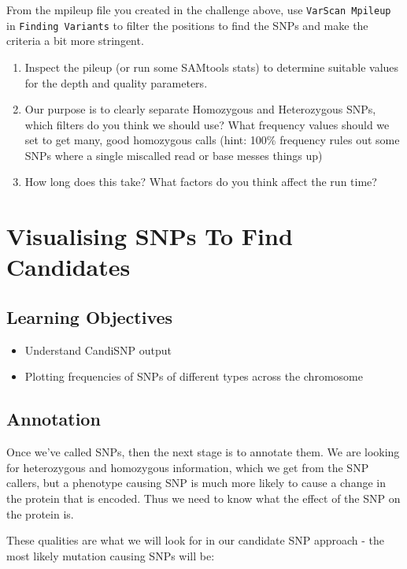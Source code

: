 \documentclass[12pt,]{book}
\providecommand{\tightlist}{%
  \setlength{\itemsep}{0pt}\setlength{\parskip}{0pt}}
\begin{document}
From the mpileup file you created in the challenge above, use
\texttt{VarScan\ Mpileup} in \texttt{Finding\ Variants} to filter the
positions to find the SNPs and make the criteria a bit more stringent.

\begin{enumerate}
\def\labelenumi{\arabic{enumi}.}
\tightlist
\item
  Inspect the pileup (or run some SAMtools stats) to determine suitable
  values for the depth and quality parameters.
\item
  Our purpose is to clearly separate Homozygous and Heterozygous SNPs,
  which filters do you think we should use? What frequency values should
  we set to get many, good homozygous calls (hint: 100\% frequency rules
  out some SNPs where a single miscalled read or base messes things up)
\item
  How long does this take? What factors do you think affect the run
  time?
\end{enumerate}

\chapter{Visualising SNPs To Find
Candidates}\label{visualising-snps-to-find-candidates}

\section{Learning Objectives}\label{learning-objectives-4}

\begin{itemize}
\tightlist
\item
  Understand CandiSNP output
\item
  Plotting frequencies of SNPs of different types across the chromosome
\end{itemize}

\section{Annotation}\label{annotation}

Once we've called SNPs, then the next stage is to annotate them. We are
looking for heterozygous and homozygous information, which we get from
the SNP callers, but a phenotype causing SNP is much more likely to
cause a change in the protein that is encoded. Thus we need to know what
the effect of the SNP on the protein is.

These qualities are what we will look for in our candidate SNP approach
- the most likely mutation causing SNPs will be:
\end{document}

